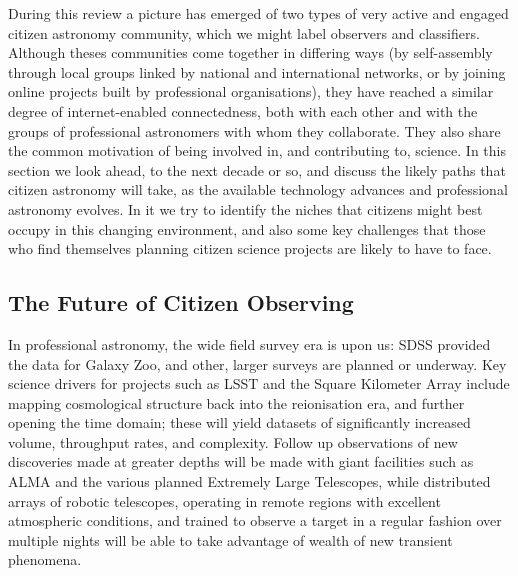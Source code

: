 \documentclass{ar2e}
\begin{document}
During this review a picture has emerged of two types of very active and engaged
citizen astronomy community, which we might label observers and classifiers. 
Although theses communities come together in differing ways (by self-assembly
through local groups linked by national and international networks, or by
joining online projects built by professional organisations), they have reached
a similar degree of internet-enabled connectedness, both with each other and
with the groups of professional astronomers with whom they  collaborate. They
also share the common motivation of being involved in, and contributing to,
science. In this section we look ahead, to the next decade or so, and discuss
the likely paths that citizen astronomy will take, as the available technology
advances and professional astronomy evolves. In it we try to identify the niches
that citizens might best occupy in this changing environment, and also some key
challenges that those who find themselves planning citizen science projects are
likely to have to face.



\subsection{The Future of Citizen Observing}

In professional astronomy, the wide field survey era is upon us: SDSS provided
the data for Galaxy Zoo, and other, larger surveys are planned or underway. Key
science drivers for projects such as LSST and the Square Kilometer Array include
mapping cosmological structure back into the reionisation era, and  further
opening the time domain; these will yield datasets of significantly increased
volume, throughput rates, and complexity.  Follow up observations of new
discoveries made at greater depths will be made with giant facilities such as
ALMA and the various planned Extremely Large Telescopes, while distributed
arrays of robotic telescopes, operating in remote regions with excellent
atmospheric conditions, and trained to observe a target in a regular fashion
over multiple nights will be able to take advantage of wealth of new transient
phenomena. 
\end{document}
